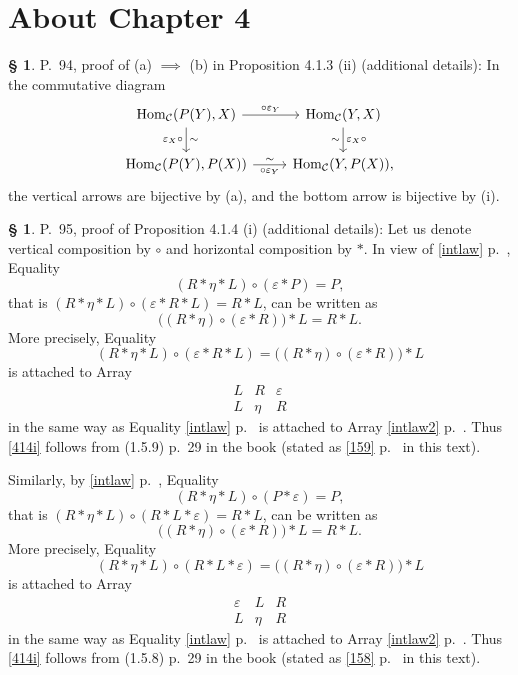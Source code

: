 \documentclass[12pt]{article}
\theoremstyle{remark}
\theoremstyle{definition}
\newtheorem{s}[thm]{\S}
\newcommand{\C}{\mathcal C}
\DeclareMathOperator{\Hom}{Hom}%
\begin{document}
\section{About Chapter 4}
%
%
\begin{s} 
P.~94, proof of (a) $\implies$ (b) in Proposition 4.1.3 (ii) (additional details): In the commutative diagram 
$$
\begin{tikzcd}
\Hom_\C(P(Y),X)\ar{d}{\sim}[swap]{\varepsilon_X\circ}\ar{r}{\circ\varepsilon_Y}&\Hom_\C(Y,X)\ar{d}{\varepsilon_X\circ}[swap]{\sim}\\ 
\Hom_\C(P(Y),P(X))\ar{r}[swap]{\circ\varepsilon_Y}{\sim}&\Hom_\C(Y,P(X)),
\end{tikzcd}
$$ 
the vertical arrows are bijective by (a), and the bottom arrow is bijective by (i).
\end{s}
%
%
\begin{s} 
P.~95, proof of Proposition 4.1.4 (i) (additional details): Let us denote vertical composition by $\circ$ and horizontal composition by $*$. In view of \eqref{intlaw} p.~\pageref{intlaw}, Equality 
%
\begin{equation}\label{414i}
(R*\eta*L)\circ(\varepsilon*P)=P,
\end{equation}
%
that is $(R*\eta*L)\circ(\varepsilon*R*L)=R*L$, can be written as 
$$
\Big((R*\eta)\circ(\varepsilon*R)\Big)*L=R*L.
$$ 
More precisely, Equality 
$$
(R*\eta*L)\circ(\varepsilon*R*L)=\Big((R*\eta)\circ(\varepsilon*R)\Big)*L
$$ 
is attached to Array
\begin{equation}%
\begin{matrix}
L&R&\varepsilon\\ 
L&\eta&R
\end{matrix}
\end{equation}
in the same way as Equality \eqref{intlaw} p.~\pageref{intlaw} is attached to Array \eqref{intlaw2} p.~\pageref{intlaw2}. Thus \eqref{414i} follows from (1.5.9) p.~29 in the book (stated as \eqref{159} p.~\pageref{159} in this text).

Similarly, by \eqref{intlaw} p.~\pageref{intlaw}, Equality 
%
\begin{equation}\label{414ib}
(R*\eta*L)\circ(P*\varepsilon)=P,
\end{equation}
%
that is $(R*\eta*L)\circ(R*L*\varepsilon)=R*L$, can be written as 
$$
\Big((R*\eta)\circ(\varepsilon*R)\Big)*L=R*L.
$$ 
More precisely, Equality 
$$
(R*\eta*L)\circ(R*L*\varepsilon)=\Big((R*\eta)\circ(\varepsilon*R)\Big)*L
$$ 
is attached to Array
\begin{equation}%
\begin{matrix}
\varepsilon&L&R\\ 
L&\eta&R
\end{matrix}
\end{equation}
in the same way as Equality \eqref{intlaw} p.~\pageref{intlaw} is attached to Array \eqref{intlaw2} p.~\pageref{intlaw2}. Thus \eqref{414i} follows from (1.5.8) p.~29 in the book (stated as \eqref{158} p.~\pageref{158} in this text). 
\end{s}
%
%
\end{document}

